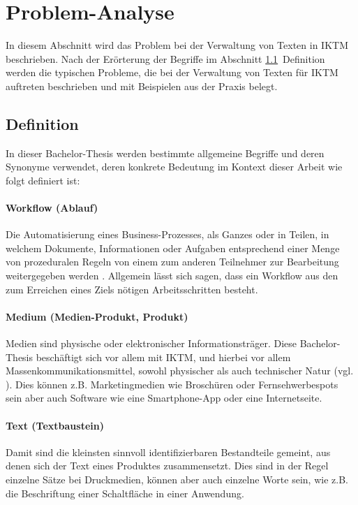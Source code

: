 \section{Problem-Analyse}

In diesem Abschnitt wird das Problem bei der Verwaltung von Texten in \ac{IKTM} beschrieben. Nach der Erörterung der Begriffe im Abschnitt \ref{l:def}~Definition werden die typischen Probleme, die bei der Verwaltung von Texten für \ac{IKTM} auftreten beschrieben und mit Beispielen aus der Praxis belegt.

\subsection{Definition}
\label{l:def}

In dieser Bachelor-Thesis werden bestimmte allgemeine Begriffe und deren Synonyme verwendet, deren konkrete Bedeutung im Kontext dieser Arbeit wie folgt definiert ist:

\paragraph{Workflow (Ablauf)} Die Automatisierung eines Business-Prozesses, als Ganzes oder in Teilen, in welchem Dokumente, Informationen oder Aufgaben entsprechend einer Menge von prozeduralen Regeln von einem zum anderen Teilnehmer zur Bearbeitung weitergegeben werden \cite[S.8]{wmc}. Allgemein lässt sich sagen, dass ein Workflow aus den zum Erreichen eines Ziels nötigen Arbeitsschritten besteht.

\paragraph{Medium (Medien-Produkt, Produkt)} Medien sind physische oder elektronischer Informationsträger. Diese Bachelor-Thesis beschäftigt sich vor allem mit \ac{IKTM}, und hierbei vor allem Massenkommunikationsmittel, sowohl physischer als auch technischer Natur (vgl. \cite[S.199–201]{schanze2002metzler}). Dies können z.B. Marketingmedien wie Broschüren oder Fernsehwerbespots sein aber auch Software wie eine Smartphone-App oder eine Internetseite. 

\paragraph{Text (Textbaustein)} Damit sind die kleinsten sinnvoll identifizierbaren Bestandteile gemeint, aus denen sich der Text eines Produktes zusammensetzt. Dies sind in der Regel einzelne Sätze bei Druckmedien, können aber auch einzelne Worte sein, wie z.B. die Beschriftung einer Schaltfläche in einer Anwendung.

